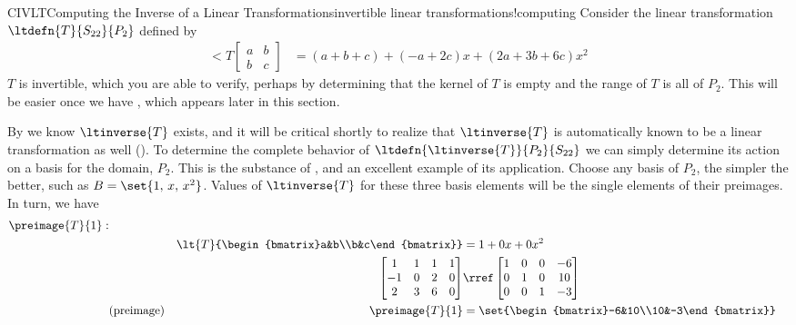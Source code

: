 %
\begin{example}{CIVLT}{Computing the Inverse of a Linear Transformations}{invertible linear transformations!computing}
%
Consider the linear transformation  $\ltdefn{T}{S_{22}}{P_2}$ defined by
%
\begin{align*}
\lt{T}{\begin{bmatrix}a&b\\b&c\end{bmatrix}}
&=
\left(a+b+c\right)
+
\left(-a+2c\right)x
+
\left(2a+3b+6c\right)x^2
\end{align*}
%
$T$ is invertible, which you are able to verify, perhaps by determining that the kernel of $T$ is empty and the range of $T$ is all of $P_2$.  This will be easier once we have , which appears later in this section.\par
%
By  we know $\ltinverse{T}$ exists, and it will be critical shortly to realize that $\ltinverse{T}$ is automatically known to be a linear transformation as well ().  To determine the complete behavior of $\ltdefn{\ltinverse{T}}{P_2}{S_{22}}$ we can simply determine its action on a basis for the domain, $P_2$.  This is the substance of , and an excellent example of its application.   Choose any basis of $P_2$, the simpler the better, such as $B=\set{1,\,x,\,x^2}$.  Values of $\ltinverse{T}$ for these three basis elements will be the single elements of their preimages.  In turn, we have
%
\begin{align*}
\preimage{T}{1}:&\\
&&\lt{T}{\begin{bmatrix}a&b\\b&c\end{bmatrix}}
&=1+0x+0x^2\\
%
&&\begin{bmatrix}
 1 & 1 & 1 & 1\\
 -1 & 0 & 2 & 0\\
 2 & 3 & 6 & 0
\end{bmatrix}
&\rref
\begin{bmatrix}
1 & 0 & 0& -6 \\
0 & 1 & 0& 10 \\
0 & 0 & 1& -3 
\end{bmatrix}
\\
&\text{(preimage)}&\preimage{T}{1}
&=\set{\begin{bmatrix}-6&10\\10&-3\end{bmatrix}}\\

\end{align*}
\end{example}
